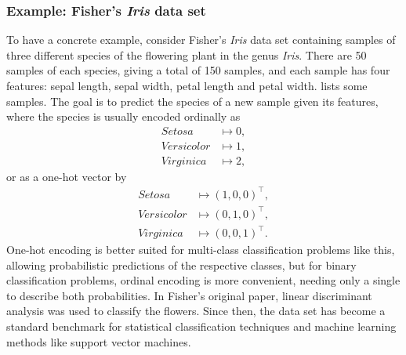 \subsubsection{Example: Fisher's \textit{Iris} data set}
\label{sec:iris}
To have a concrete example, consider Fisher's \textit{Iris} data set \cite{fisher1936} containing samples of three different species of the flowering plant in the genus \textit{Iris}.
There are 50 samples of each species, giving a total of 150 samples, and each sample has four features: sepal length, sepal width, petal length and petal width.
 lists some samples.
The goal is to predict the species of a new sample given its features, where the species is usually encoded ordinally as
\begin{equation}
    \label{eq:iris_encoding}
    \begin{split}
        \textit{Setosa} &\mapsto 0,\\
        \textit{Versicolor} &\mapsto 1,\\
        \textit{Virginica} &\mapsto 2,
    \end{split}
\end{equation}
or as a one-hot vector by
\begin{equation}
    \label{eq:iris_one_hot}
    \begin{split}
        \textit{Setosa} &\mapsto (1, 0, 0)^\top,\\
        \textit{Versicolor} &\mapsto (0, 1, 0)^\top,\\
        \textit{Virginica} &\mapsto (0, 0, 1)^\top.
    \end{split}
\end{equation}
One-hot encoding is better suited for multi-class classification problems like this, allowing probabilistic predictions of the respective classes, but for binary classification problems, ordinal encoding is more convenient, needing only a single to describe both probabilities.
In Fisher's original paper, linear discriminant analysis was used to classify the flowers.
Since then, the data set has become a standard benchmark for statistical classification techniques and machine learning methods like support vector machines.


